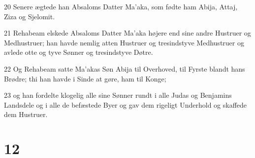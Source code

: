 \par 20 Senere ægtede han Absaloms Datter Ma'aka, som fødte ham Abija, Attaj, Ziza og Sjelomit.
\par 21 Rehabeam elskede Absaloms Datter Ma'aka højere end sine andre Hustruer og Medhustruer; han havde nemlig atten Hustruer og tresindstyve Medhustruer og avlede otte og tyve Sønner og tresindstyve Døtre.
\par 22 Og Rehabeam satte Ma'akas Søn Abija til Overhoved, til Fyrste blandt hans Brødre; thi han havde i Sinde at gøre, ham til Konge;
\par 23 og han fordelte klogelig alle sine Sønner rundt i alle Judas og Benjamins Landsdele og i alle de befæstede Byer og gav dem rigeligt Underhold og skaffede dem Hustruer.

\chapter{12}

